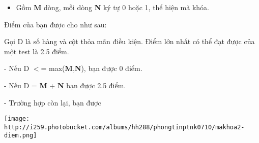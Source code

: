 \begin{itemize}
	\item Gồm \textbf{M} dòng, mỗi dòng \textbf{N} ký tự 0 hoặc 1, thể hiện mã khóa.
\end{itemize}

Điểm của bạn được cho như sau:

Gọi D là số hàng và cột thỏa mãn điều kiện. Điểm lớn nhất có thể đạt được của một test là 2.5 điểm.

- Nếu D $<$= max(\textbf{M},\textbf{N}), bạn được 0 điểm.

- Nếu D = \textbf{M} + \textbf{N} bạn được 2.5 điểm.

- Trường hợp còn lại, bạn được


\texttt{[image: http://i259.photobucket.com/albums/hh288/phongtinptnk0710/makhoa2-diem.png]}